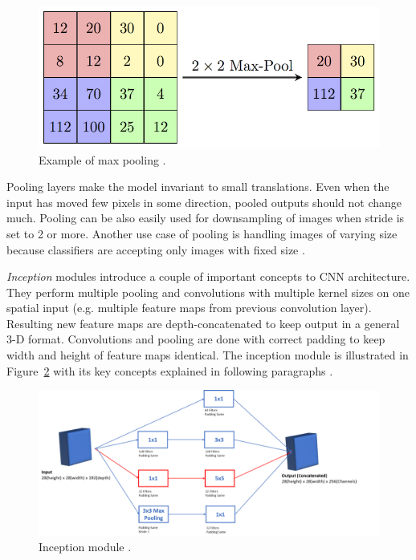 \begin{figure}[ht]\centering
    \centering
    \includegraphics[]{figures/todo-maxpool.png}
    \caption{Example of max pooling .}
    \label{fig:pooling}
\end{figure}

Pooling layers make the model invariant to small translations. Even when the input has moved few pixels in some direction, pooled outputs should not change much. Pooling can be also easily used for downsampling of images when stride is set to 2 or more. Another use case of pooling is handling images of varying size because classifiers are accepting only images with fixed size \cite{Goodfellow-et-al-2016}.

\textit{Inception} modules introduce a couple of important concepts to CNN architecture. They perform multiple pooling and convolutions with multiple kernel sizes on one spatial input (e.g. multiple feature maps from previous convolution layer). Resulting new feature maps are depth-concatenated to keep output in a general 3-D format. Convolutions and pooling are done with correct padding to keep width and height of feature maps identical. The inception module is illustrated in Figure~\ref{fig:inception} with its key concepts explained in following paragraphs \cite{szegedy2014going}.

\begin{figure}[ht]\centering
    \centering
    \includegraphics[scale=0.3]{figures/todo-inception.png}
    \caption{Inception module .}
    \label{fig:inception}
\end{figure}

